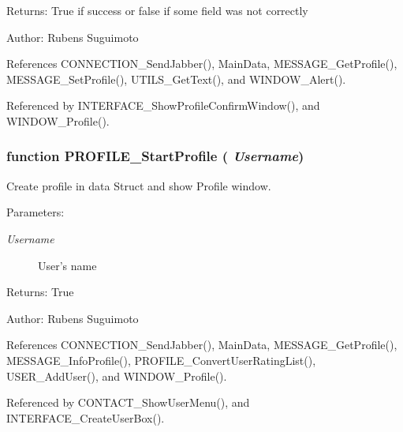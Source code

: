 \begin{Desc}
\item[Returns:]True if success or false if some field was not correctly \end{Desc}
\begin{Desc}
\item[Author:]Rubens Suguimoto \end{Desc}


References CONNECTION\_\-SendJabber(), MainData, MESSAGE\_\-GetProfile(), MESSAGE\_\-SetProfile(), UTILS\_\-GetText(), and WINDOW\_\-Alert().

Referenced by INTERFACE\_\-ShowProfileConfirmWindow(), and WINDOW\_\-Profile().
\subsubsection[PROFILE\_\-StartProfile]{\setlength{\rightskip}{0pt plus 5cm}function PROFILE\_\-StartProfile ( {\em Username})}\label{profile_2profile_8js_f78b5d430fb82f23ddc58faaf7ad182d}


Create profile in data Struct and show Profile window. 

\begin{Desc}
\item[Parameters:]
\begin{description}
\item[{\em Username}]User's name \end{description}
\end{Desc}
\begin{Desc}
\item[Returns:]True \end{Desc}
\begin{Desc}
\item[Author:]Rubens Suguimoto \end{Desc}


References CONNECTION\_\-SendJabber(), MainData, MESSAGE\_\-GetProfile(), MESSAGE\_\-InfoProfile(), PROFILE\_\-ConvertUserRatingList(), USER\_\-AddUser(), and WINDOW\_\-Profile().

Referenced by CONTACT\_\-ShowUserMenu(), and INTERFACE\_\-CreateUserBox().
